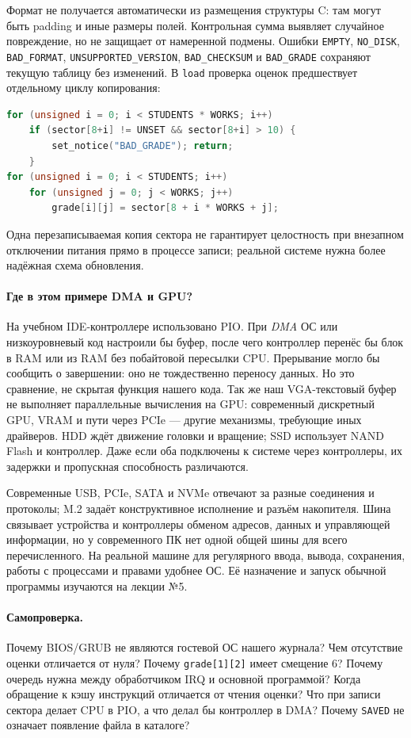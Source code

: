 Формат не получается автоматически из размещения структуры C: там
могут быть padding и иные размеры полей. Контрольная сумма выявляет
случайное повреждение, но не защищает от намеренной подмены. Ошибки
\texttt{EMPTY}, \texttt{NO\_DISK}, \texttt{BAD\_FORMAT},
\texttt{UNSUPPORTED\_VERSION}, \texttt{BAD\_CHECKSUM} и
\texttt{BAD\_GRADE} сохраняют текущую таблицу без изменений.
В \texttt{load} проверка оценок предшествует отдельному циклу копирования:
\begin{lstlisting}[language=C,basicstyle=\ttfamily\small]
for (unsigned i = 0; i < STUDENTS * WORKS; i++)
    if (sector[8+i] != UNSET && sector[8+i] > 10) {
        set_notice("BAD_GRADE"); return;
    }
for (unsigned i = 0; i < STUDENTS; i++)
    for (unsigned j = 0; j < WORKS; j++)
        grade[i][j] = sector[8 + i * WORKS + j];
\end{lstlisting}
Одна перезаписываемая копия сектора не гарантирует целостность при
внезапном отключении питания прямо в процессе записи; реальной системе
нужна более надёжная схема обновления.

\paragraph{Где в этом примере DMA и GPU?}
На учебном IDE-контроллере использовано PIO. При \emph{DMA} ОС или
низкоуровневый код настроили бы буфер, после чего контроллер перенёс
бы блок в RAM или из RAM без побайтовой пересылки CPU. Прерывание могло
бы сообщить о завершении: оно не тождественно переносу данных. Но это
сравнение, не скрытая функция нашего кода. Так же наш VGA-текстовый
буфер не выполняет параллельные вычисления на GPU: современный дискретный
GPU, VRAM и пути через PCIe --- другие механизмы, требующие иных драйверов.
HDD ждёт движение головки и вращение; SSD использует NAND Flash и
контроллер. Даже если оба подключены к системе через контроллеры, их
задержки и пропускная способность различаются.

Современные USB, PCIe, SATA и NVMe отвечают за разные соединения и
протоколы; M.2 задаёт конструктивное исполнение и разъём накопителя.
Шина связывает устройства и контроллеры обменом адресов, данных и
управляющей информации, но у современного ПК нет одной общей шины
для всего перечисленного. На реальной машине для регулярного ввода,
вывода, сохранения, работы с процессами и правами удобнее ОС. Её
назначение и запуск обычной программы изучаются на лекции №5.

\paragraph{Самопроверка.}
Почему BIOS/GRUB не являются гостевой ОС нашего журнала? Чем отсутствие
оценки отличается от нуля? Почему \texttt{grade[1][2]} имеет смещение 6?
Почему очередь нужна между обработчиком IRQ и основной программой?
Когда обращение к кэшу инструкций отличается от чтения оценки?
Что при записи сектора делает CPU в PIO, а что делал бы контроллер в DMA?
Почему \texttt{SAVED} не означает появление файла в каталоге?

